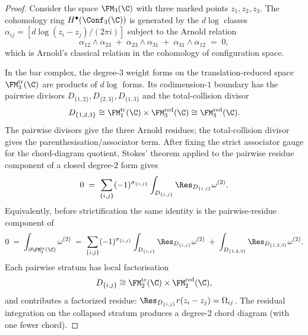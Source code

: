 \begin{proof}
Consider the space $\FM_3(\C)$ with three marked points
$z_1, z_2, z_3$. The cohomology ring
$H^\bullet(\Conf_3(\C))$ is generated by the $d\log$ classes
$\alpha_{ij} = [d\log(z_i - z_j)/(2\pi i)]$ subject to the
Arnold relation
\begin{equation}\label{eq:arnold-relation}
\alpha_{12} \wedge \alpha_{23}
\;+\;
\alpha_{23} \wedge \alpha_{31}
\;+\;
\alpha_{31} \wedge \alpha_{12}
\;=\; 0,
\end{equation}
which is Arnold's classical relation in the cohomology of
configuration space.

In the bar complex, the degree-$3$ weight forms on the
translation-reduced space \(\FM^{\mathrm{tr}}_3(\C)\)
are products of \(d\log\) forms.  Its codimension-$1$ boundary has
the pairwise divisors \(D_{\{1,2\}},D_{\{2,3\}},D_{\{1,3\}}\) and the
total-collision divisor
\[
D_{\{1,2,3\}}\cong
\FM^{\mathrm{tr}}_1(\C)\times\FM^{\mathrm{red}}_3(\C)
\cong \FM^{\mathrm{red}}_3(\C).
\]
The pairwise divisors give the three Arnold residues; the
total-collision divisor gives the parenthesisation/associator term.
After fixing the strict associator gauge for the chord-diagram
quotient, Stokes' theorem applied to the pairwise residue component of
a closed degree-$2$ form gives
\[
0
\;=\;
\sum_{\{i,j\}} (-1)^{\sigma_{\{i,j\}}}
\int_{D_{\{i,j\}}} \Res_{D_{\{i,j\}}} \omega^{(2)} .
\]
Equivalently, before strictification the same identity is the
pairwise-residue component of
\[
0
\;=\;
\int_{\partial \FM^{\mathrm{tr}}_3(\C)} \omega^{(2)}
\;=\;
\sum_{\{i,j\}} (-1)^{\sigma_{\{i,j\}}}
\int_{D_{\{i,j\}}} \Res_{D_{\{i,j\}}} \omega^{(2)}
\;+\;\int_{D_{\{1,2,3\}}}\Res_{D_{\{1,2,3\}}}\omega^{(2)} .
\]
Each pairwise stratum has local factorisation
\[
D_{\{i,j\}}\cong
\FM^{\mathrm{tr}}_2(\C)\times\FM^{\mathrm{red}}_2(\C),
\]
and contributes a factorized residue:
$\Res_{D_{\{i,j\}}} r(z_i - z_j) = \Omega_{ij}$. The
residual integration on the collapsed stratum produces a
degree-$2$ chord diagram (with one fewer chord).


\end{proof}
